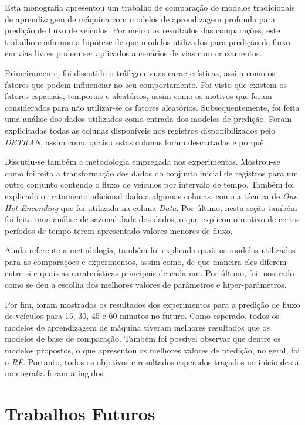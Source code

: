 Esta monografia apresentou um trabalho de comparação de modelos tradicionais de aprendizagem de máquina com modelos de aprendizagem profunda para predição de fluxo de veículos. Por meio dos resultados das comparações, este trabalho confirmou a hipótese de que modelos utilizados para predição de fluxo em vias livres podem ser aplicados a cenários de vias com cruzamentos.

Primeiramente, foi discutido o tráfego e suas características, assim como os fatores que podem influenciar no seu comportamento. Foi visto que existem os fatores espaciais, temporais e aleatórios, assim como os motivos que foram considerados para não utilizar-se os fatores aleatórios. Subsequentemente, foi feita uma análise dos dados utilizados como entrada dos modelos de predição. Foram explicitadas todas as colunas disponíveis nos registros disponibilizados pelo \textit{\acrshort{DETRAN}}, assim como quais destas colunas foram descartadas e porquê. 

Discutiu-se também a metodologia empregada nos experimentos. Mostrou-se como foi feita a transformação dos dados do conjunto inicial de registros para um outro conjunto contendo o fluxo de veículos por intervalo de tempo. Também foi explicado o tratamento adicional dado a algumas colunas, como a técnica de \textit{One Hot Enconding} que foi utilizada na coluna \textit{Data}. Por último, nesta seção também foi feita uma análise de sazonalidade dos dados, o que explicou o motivo de certos períodos de tempo terem apresentado valores menores de fluxo.

Ainda referente a metodologia, também foi explicado quais os modelos utilizados para as comparações e experimentos, assim como, de que maneira eles diferem entre si e quais as caraterísticas principais de cada um. Por último, foi mostrado como se deu a escolha dos melhores valores de parâmetros e hiper-parâmetros.

Por fim, foram mostrados os resultados dos experimentos para a predição de fluxo de veículos para 15, 30, 45 e 60 minutos no futuro. Como esperado, todos os modelos de aprendizagem de máquina tiveram melhores resultados que os modelos de base de comparação. Também foi possível observar que dentre os modelos propostos, o que apresentou os melhores valores de predição, no geral, foi o \textit{\acrshort{RF}}. Portanto, todos os objetivos e resultados esperados traçados no início desta monografia foram atingidos.


\section{Trabalhos Futuros}

